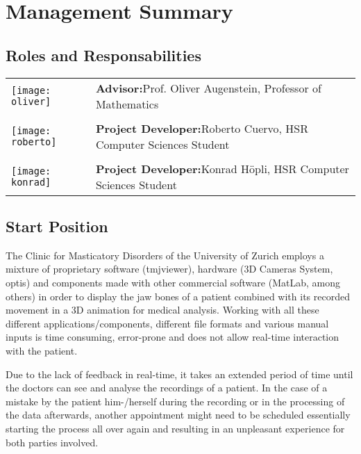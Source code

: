 \section{Management Summary}

\subsection{Roles and Responsabilities}
\begin{table}[h!]
	\begin{tabular}{p{5cm}p{11cm}}
		 \parbox[c]{1em}{ \texttt{[image: oliver]} }  & \textbf{Advisor:}\quad  Prof. Oliver Augenstein, Professor of Mathematics \\
				 & \\ %
		 \parbox[c]{1em}{ \texttt{[image: roberto]} }  & \textbf{Project Developer:}\quad  Roberto Cuervo, HSR Computer Sciences Student\\
		 		 & \\ %
		 \parbox[c]{1em}{ \texttt{[image: konrad]} }  & \textbf{Project Developer:}\quad  Konrad H\"opli, HSR Computer Sciences Student \\
	\end{tabular}
\end{table}



\subsection{Start Position}
 
The Clinic for Masticatory Disorders of the University of Zurich employs a mixture of proprietary software (\gls{tmjviewer}), hardware (3D Cameras System, \gls{optis}) and components made with other commercial software (MatLab, among others) in order to display the jaw bones of a patient combined with its recorded movement in a 3D animation for medical analysis. Working with all these different applications/components, different file formats and various manual inputs is time consuming, error-prone and does not allow real-time interaction with the patient. 

Due to the lack of feedback in real-time, it takes an extended period of time until the doctors can see and analyse the recordings of a patient. In the case of a mistake by the patient him-/herself during the recording or in the processing of the data afterwards, another appointment might need to be scheduled essentially starting the process all over again and resulting in an unpleasant experience for both parties involved.

